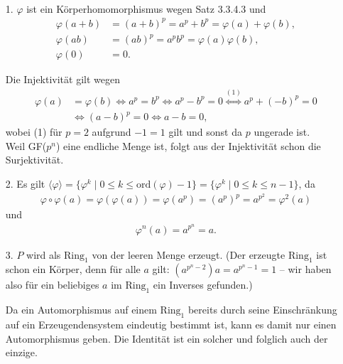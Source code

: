 \begin{solution}\leavevmode \\
    \begin{itemize}
        \item[1.] $\varphi$ ist ein Körperhomomorphismus wegen Satz 3.3.4.3 und
        \begin{align*}
            \varphi(a + b) &= (a + b)^p = a^p + b^p = \varphi(a) + \varphi(b), \\
            \varphi(ab) &= (ab)^p = a^p b^p = \varphi(a) \varphi(b), \\
            \varphi(0) &= 0.
        \end{align*}

    Die Injektivität gilt wegen
    \begin{align*}
        \varphi(a) &= \varphi(b) \Longleftrightarrow a^p = b^p
        \iff a^p - b^p = 0 \stackrel{(1)}{\iff} a^p + (-b)^p = 0 \\ &
        \Longleftrightarrow (a-b)^p = 0  \Longleftrightarrow a - b = 0,
    \end{align*}
    wobei (1) für $p = 2$ aufgrund $-1 = 1$ gilt und sonst da $p$ ungerade ist. \\
    Weil GF($p^n$) eine endliche Menge ist, folgt aus der Injektivität schon die Surjektivität.

    \item[2.] Es gilt $\langle\varphi\rangle =
    \{\varphi^k\mid 0 \leq k \leq \mathrm{ord}(\varphi) - 1\}
    = \{\varphi^k\mid 0 \leq k \leq n - 1\}$, da
     \begin{align*}
      \varphi\circ\varphi(a) = \varphi(\varphi(a)) = \varphi(a^p) = (a^p)^p = a^{p^2} = \varphi^2(a)
    \end{align*}
    und
    \begin{align*}
      \varphi^n(a) = a^{p^n} = a.
    \end{align*}

    \item[3.] $P$ wird als $\mathrm{Ring}_1$ von der leeren Menge erzeugt. (Der erzeugte $\mathrm{Ring}_1$ ist schon ein Körper, denn für alle $a$ gilt: $(a^{p^n-2}) a = a^{p^n-1} = 1$ -- wir haben also für ein beliebiges $a$ im $\mathrm{Ring}_1$ ein Inverses gefunden.)

    Da ein Automorphismus auf einem $\mathrm{Ring}_1$ bereits durch seine Einschränkung auf ein Erzeugendensystem eindeutig bestimmt ist, kann es damit nur einen Automorphismus geben. Die Identität ist ein solcher und folglich auch der einzige.


\end{itemize}
\end{solution}
